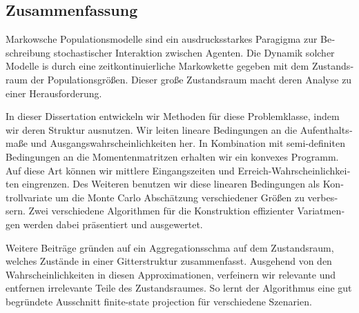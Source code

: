 \begin{otherlanguage}{ngerman}
\chapter*{Zusammenfassung}
Markowsche Populationsmodelle sind ein ausdrucksstarkes Paragigma zur Beschreibung stochastischer Interaktion zwischen Agenten.
Die Dynamik solcher Modelle is durch eine zeitkontinuierliche Markowkette gegeben mit dem Zustandsraum der Populationsgrößen.
Dieser große Zustandsraum macht deren Analyse zu einer Herausforderung.

In dieser Dissertation entwickeln wir Methoden für diese Problemklasse, indem wir deren Struktur ausnutzen.
Wir leiten lineare Bedingungen an die Aufenthaltsmaße und Ausgangswahrscheinlichkeiten her.
In Kombination mit semi-definiten Bedingungen an die Momentenmatritzen erhalten wir ein konvexes Programm.
Auf diese Art können wir mittlere Eingangszeiten und Erreich-Wahrscheinlichkeiten eingrenzen.
Des Weiteren benutzen wir diese linearen Bedingungen als Kontrollvariate um die Monte Carlo Abschätzung verschiedener Größen zu verbessern.
Zwei verschiedene Algorithmen für die Konstruktion effizienter Variatmengen werden dabei präsentiert und ausgewertet.

Weitere Beiträge gründen auf ein Aggregationsschma auf dem Zustandsraum, welches Zustände in einer Gitterstruktur zusammenfasst.
Ausgehend von den Wahrscheinlichkeiten in diesen Approximationen, verfeinern wir relevante und entfernen irrelevante Teile des Zustandsraumes.
    So lernt der Algorithmus eine gut begründete Ausschnitt \glqq finite-state projection\grqq{} für verschiedene Szenarien.
\end{otherlanguage}


\vfill
